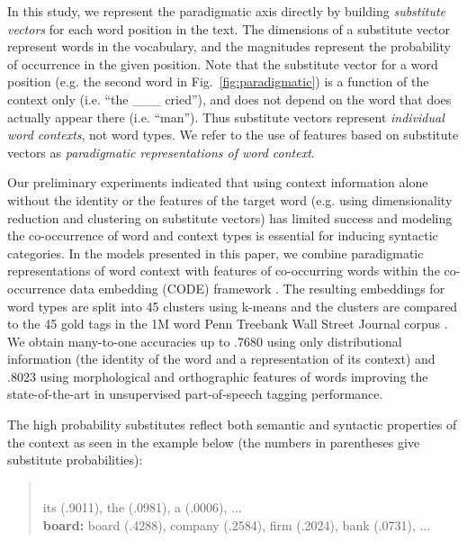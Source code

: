 In this study, we represent the paradigmatic axis directly by building
{\em substitute vectors} for each word position in the text.  The
dimensions of a substitute vector represent words in the vocabulary,
and the magnitudes represent the probability of occurrence in the given
position.  Note that the substitute vector for a word position (e.g.
the second word in Fig.~\ref{fig:paradigmatic}) is a function of the
context only (i.e. ``the \_\_\_ cried''), and does not depend on the
word that does actually appear there (i.e. ``man'').  Thus substitute
vectors represent {\em individual word contexts}, not word types.  We
refer to the use of features based on substitute vectors as 
{\em paradigmatic representations of word context}.

Our preliminary experiments indicated that using context information
alone without the identity or the features of the target word
(e.g. using dimensionality reduction and clustering on substitute
vectors) has limited success and modeling the co-occurrence of word
and context types is essential for inducing syntactic categories.  In
the models presented in this paper, we combine paradigmatic
representations of word context with features of co-occurring words
within the co-occurrence data embedding (CODE) framework
\cite{globerson2007euclidean,maron2010sphere}.  The resulting
embeddings for word types are split into 45 clusters using k-means and
the clusters are compared to the 45 gold tags in the 1M word Penn
Treebank Wall Street Journal corpus \cite{treebank3}.  We obtain
many-to-one accuracies up to .7680 using only distributional
information (the identity of the word and a representation of its
context) and .8023 using morphological and orthographic features of
words improving the state-of-the-art in unsupervised part-of-speech
tagging performance.

The high probability substitutes reflect both semantic and syntactic
properties of the context as seen in the example below (the numbers in
parentheses give substitute probabilities):

\begin{quotation}
\\

 its (.9011), the (.0981), a (.0006), $\ldots$\\
{\bf board:} board (.4288), company (.2584), firm (.2024), bank (.0731), $\ldots$
\end{quotation}


